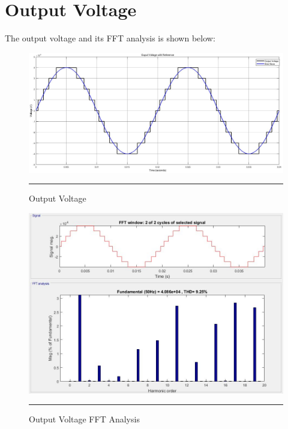 \section{Output Voltage}
The output voltage and its FFT analysis is shown below:
\begin{figure}[htbp]
	\centering
	\includegraphics[width = 6in]{./Figures/Photos/Simulink/Output.jpg}
	\rule{35em}{1pt}
	\caption{Output Voltage}
\end{figure}
\begin{figure}[htbp]
	\centering
	\includegraphics[width = 6in]{./Figures/Photos/Simulink/Output_FFT.jpg}
	\rule{35em}{1pt}
	\caption{Output Voltage FFT Analysis}
\end{figure}
